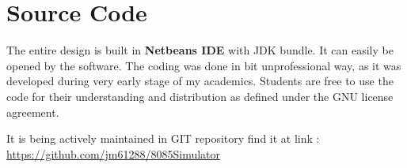 \section{Source Code}
The entire design is built in \textbf{Netbeans IDE} with JDK bundle. It can easily be opened by the software. The coding was done in bit unprofessional way, as it was developed during very early stage of my academics. Students are free to use the code for their understanding and distribution as defined under the GNU license agreement. 


It is being actively maintained in GIT repository find it at link :\\
\url{https://github.com/jm61288/8085Simulator}